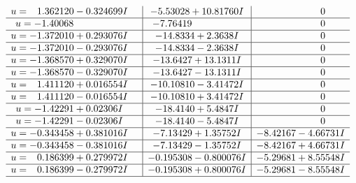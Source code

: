 \documentclass[1p]{elsarticle_modified}
\theoremstyle{definition}
\begin{document}
$$\begin{array}{c|c|c}
\begin{aligned}
u &= \phantom{-}1.362120 - 0.324699 I\end{aligned}
 & -5.53028 + 10.81760 I & \phantom{-0.000000 } 0 \\ \hline\begin{aligned}
u &= -1.40068\phantom{ +0.000000I}\end{aligned}
 & -7.76419\phantom{ +0.000000I} & \phantom{-0.000000 } 0 \\ \hline\begin{aligned}
u &= -1.372010 + 0.293076 I\end{aligned}
 & -14.8334 + 2.3638 I & \phantom{-0.000000 } 0 \\ \hline\begin{aligned}
u &= -1.372010 - 0.293076 I\end{aligned}
 & -14.8334 - 2.3638 I & \phantom{-0.000000 } 0 \\ \hline\begin{aligned}
u &= -1.368570 + 0.329070 I\end{aligned}
 & -13.6427 + 13.1311 I & \phantom{-0.000000 } 0 \\ \hline\begin{aligned}
u &= -1.368570 - 0.329070 I\end{aligned}
 & -13.6427 - 13.1311 I & \phantom{-0.000000 } 0 \\ \hline\begin{aligned}
u &= \phantom{-}1.411120 + 0.016554 I\end{aligned}
 & -10.10810 - 3.41472 I & \phantom{-0.000000 } 0 \\ \hline\begin{aligned}
u &= \phantom{-}1.411120 - 0.016554 I\end{aligned}
 & -10.10810 + 3.41472 I & \phantom{-0.000000 } 0 \\ \hline\begin{aligned}
u &= -1.42291 + 0.02306 I\end{aligned}
 & -18.4140 + 5.4847 I & \phantom{-0.000000 } 0 \\ \hline\begin{aligned}
u &= -1.42291 - 0.02306 I\end{aligned}
 & -18.4140 - 5.4847 I & \phantom{-0.000000 } 0 \\ \hline\begin{aligned}
u &= -0.343458 + 0.381016 I\end{aligned}
 & -7.13429 + 1.35752 I & -8.42167 - 4.66731 I \\ \hline\begin{aligned}
u &= -0.343458 - 0.381016 I\end{aligned}
 & -7.13429 - 1.35752 I & -8.42167 + 4.66731 I \\ \hline\begin{aligned}
u &= \phantom{-}0.186399 + 0.279972 I\end{aligned}
 & -0.195308 - 0.800076 I & -5.29681 + 8.55548 I \\ \hline\begin{aligned}
u &= \phantom{-}0.186399 - 0.279972 I\end{aligned}
 & -0.195308 + 0.800076 I & -5.29681 - 8.55548 I\\
 \hline 
 \end{array}$$\newpage
\end{document}
